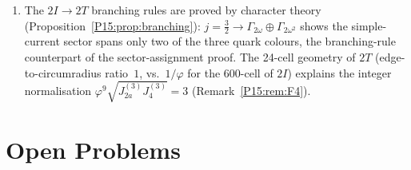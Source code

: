 \documentclass[11pt,a4paper]{article}
\theoremstyle{definition}\newtheorem{definition}[theorem]{Definition}
\theoremstyle{remark}
\newcommand{\vp}{\varphi}
\newcommand{\Ja}{J_{2a}}
\newcommand{\Jfour}{J_4}
\newcommand{\twoI}{2I}
\newcommand{\twoT}{2T}
\begin{document}
\begin{enumerate}[noitemsep,label=(\arabic*)]
  (Proposition~\ref{P15:prop:kappa4}): $\delta r_3^{(\kappa^4)}=
  9\langle\kappa^4\rangle/(4 C_3^{*4})=0.000938$, giving
  $C_3^*=2.5062$ (a $0.392\%$ shift from the $O(\langle\kappa^2\rangle)$
  value).
\item The $2I\to 2T$ branching rules are proved by character theory
  (Proposition~\ref{P15:prop:branching}): $j=\tfrac32\to\Gamma_{2\omega}
  \oplus\Gamma_{2\omega^2}$ shows the simple-current sector spans only
  two of the three quark colours, the branching-rule counterpart of
  the sector-assignment proof. The 24-cell geometry of $\twoT$
  (edge-to-circumradius ratio~$1$, vs.\ $1/\vp$ for the 600-cell of
  $\twoI$) explains the integer normalisation
  $\vp^9\sqrt{\Ja^{(3)}\Jfour^{(3)}}=3$ (Remark~\ref{P15:rem:F4}).
\end{enumerate}

\section{Open Problems}
\label{P15:sec:open}
\end{document}
